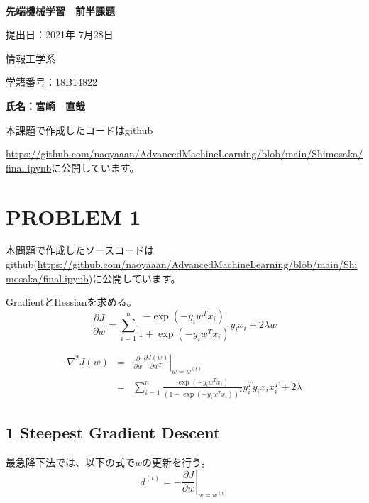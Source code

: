 \documentclass[a4j,11pt]{jarticle}
\begin{document}
\begin{center}
　\vspace{10mm}

{\bf {\huge 先端機械学習　前半課題}}

\vspace{80mm}

提出日：2021年 7月28日

\vspace{10mm}

情報工学系

\vspace{10mm}

学籍番号：18B14822

\vspace{10mm}


\vspace{20mm}

{\bf {\LARGE 氏名：宮崎　直哉}}
\end{center}





\newpage



本課題で作成したコードはgithub

\url{https://github.com/naoyaaan/AdvancedMachineLearning/blob/main/Shimosaka/final.ipynb}に公開しています。

\section{PROBLEM 1}
本問題で作成したソースコードはgithub(\url{https://github.com/naoyaaan/AdvancedMachineLearning/blob/main/Shimosaka/final.ipynb})に公開しています。

GradientとHessianを求める。
\begin{equation}
    \frac{\partial{J}}{\partial{w}} = \sum_{i=1}^{n} \frac{-\exp(-y_iw^{T}x_i)}{1 + \exp(-y_iw^{T}x_i)}y_{i}x_{i} + 2\lambda w
\end{equation}

\begin{eqnarray}
    \nabla^2 J(w) &=& \frac{\partial}{\partial w} \left.\frac{\partial J(w)}{\partial w^{T}}\right|_{w=w^{(t)}} \\
    &=& \sum_{i=1}^{n} \frac{\exp(-y_iw^{T}x_i)}{(1 + \exp(-y_iw^{T}x_i))^2}y^{T}_{i}y_{i}x_{i}x^{T}_{i} + 2\lambda
\end{eqnarray}

\subsection*{1 Steepest Gradient Descent}
最急降下法では、以下の式で$w$の更新を行う。
\begin{equation}
    d^{(t)} = -\left.\frac{\partial{J}}{\partial{w}}\right|_{w=w^{(t)}}
\end{equation}
\end{document}
